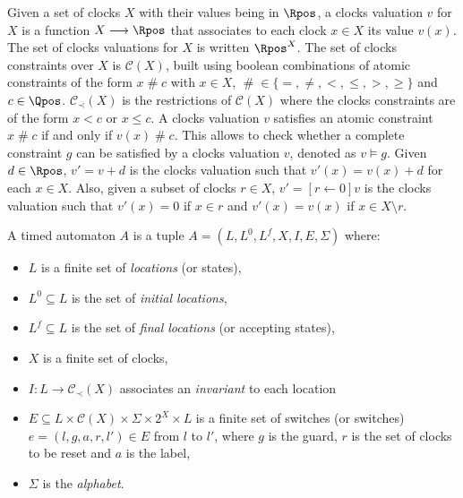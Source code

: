 Given a set of clocks $X$ with their values being in $\Rpos$, a clocks valuation $v$ for $X$ is a function $X \longrightarrow \Rpos$ that associates to each clock $x \in X$ its value $v(x)$. The set of clocks valuations for $X$ is written $\Rpos^X$. The set of clocks constraints over $X$ is $\mathcal{C}(X)$, built using boolean combinations of atomic constraints of the form $x \;\#\; c$ with $x \in X$, $\;\#\; \in \{=, \neq, <, \leq, >, \geq \}$ and $c \in \Qpos$. $\mathcal{C}_{\prec}(X)$ is the restrictions of $\mathcal{C}(X)$ where the clocks constraints are of the form $x < c$ or $x \leq c$. A clocks valuation $v$ satisfies an atomic constraint $x \;\#\; c$ if and only if $v(x) \;\#\; c$. This allows to check whether a complete constraint $g$ can be satisfied by a clocks valuation $v$, denoted as $v \models g$. Given $d \in \Rpos$, $v' = v + d$ is the clocks valuation such that $v'(x) = v(x) + d$ for each $x \in X$. Also, given a subset of clocks $r \in X$, $v' = [r \leftarrow 0]v$ is the clocks valuation such that $v'(x) = 0$ if $x \in r$ and $v'(x) = v(x)$ if $x \in X \setminus r$.

\begin{definition} \cite{RADLD94,RA98}
  
A timed automaton $A$ is a tuple $A = (L, L^0, L^f, X, I, E, \Sigma)$ where:
\begin{itemize}

    \item $L$ is a finite set of \emph{locations} (or states),

    \item $L^0 \subseteq L$ is the set of \emph{initial locations},

    \item $L^f \subseteq L$ is the set of \emph{final locations} (or accepting states),

    \item $X$ is a finite set of clocks,

    \item $I : L \rightarrow \mathcal{C}_{\prec}(X)$ associates an \emph{invariant} to each location

    \item $E \subseteq L \times \mathcal{C}(X) \times \Sigma \times 2^X \times L$ is a finite set of switches (or switches) $e = (l, g, a, r, l') \in E$ from $l$ to $l'$, where $g$ is the guard, $r$ is the set of clocks to be reset and $a$ is the label,

    \item $\Sigma$ is the \emph{alphabet}.

\end{itemize}
\end{definition}

